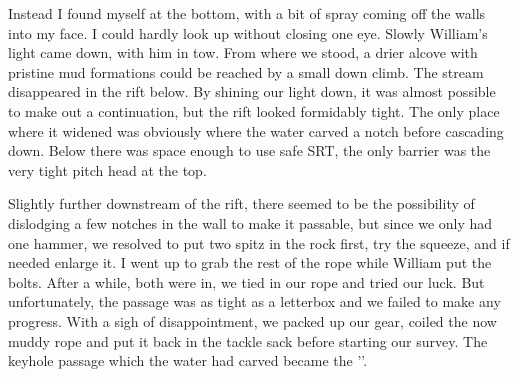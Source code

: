Instead I found myself at the bottom, with a bit of spray coming off the walls into my face. I could hardly look up without closing one eye. Slowly William's light came down, with him in tow. From where we stood, a drier alcove with pristine mud formations could be reached by a small down climb. The stream disappeared in the rift below. By shining our light down, it was almost possible to make out a continuation, but the rift looked formidably tight. The only place where it widened was obviously where the water carved a notch before cascading down. Below there was space enough to use safe SRT, the only barrier was the very tight pitch head at the top.

Slightly further downstream of the rift, there seemed to be the possibility of dislodging a few notches in the wall to make it passable, but since we only had one hammer, we resolved to put two spitz in the rock first, try the squeeze, and if needed enlarge it. I went up to grab the rest of the rope while William put the bolts. After a while, both were in, we tied in our rope and tried our luck. But unfortunately, the passage was as tight as a letterbox and we failed to make any progress. With a sigh of disappointment, we packed up our gear, coiled the now muddy rope and put it back in the tackle sack before starting our survey. The keyhole passage which the water had carved became the ''.


